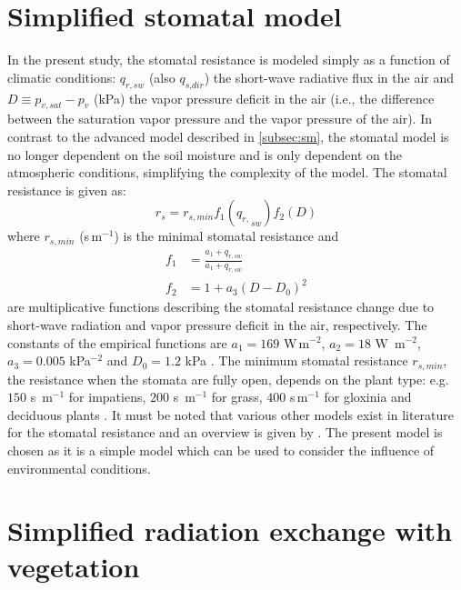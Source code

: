 \section{Simplified stomatal model}
\label{sec:simplifiedstomatalmodel}
In the present study, the stomatal resistance is modeled simply as a function of climatic conditions: $q_{\mathit{r,sw}}$ (also $q_{\textit{s,dir}}$) the short-wave radiative flux in the air and $D\equiv p_{\mathit{v,sat}} - p_v$ (kPa) the vapor pressure deficit in the air (i.e., the difference between the saturation vapor pressure and the vapor pressure of the air). In contrast to the advanced model described in \cref{subsec:sm}, the stomatal model is no longer dependent on the soil moisture and is only dependent on the atmospheric conditions, simplifying the complexity of the model. The stomatal resistance is given as:
\begin{equation}
{r_s} = {r_{s,{\mathit{min}}}}{f_1}({q_{r,}}_{sw}){f_2}(D)
\label{eq:rs}
\end{equation}
where $r_{\mathit{s,min}}$ (s\,m$^{-1}$) is the minimal stomatal resistance and
\begin{align}
f_1 &= \frac{a_1 + q_{\mathit{r,sw}}}{a_1 + q_{\mathit{r,sw}}}\\
f_2 &= 1 + a_3 (D-D_0)^2
\end{align}
are multiplicative functions describing the stomatal resistance change due to short-wave radiation and vapor pressure deficit in the air, respectively. The constants of the empirical functions are $a_1=169$ W\,m$^{-2}$, $a_2=18$ W~m$^{-2}$, $a_3=\num{0.005}$ kPa$^{-2}$ and $D_0=1.2$ kPa \citep{Kichah2012}. The minimum stomatal resistance $r_{s,\mathit{min}}$, the resistance when the stomata are fully open, depends on the plant type: e.g. $150$ s~m$^{-1}$ for impatiens, $200$ s~m$^{-1}$ for grass, $400$ s\,m$^{-1}$ for gloxinia and deciduous plants \citep{Baille1994, Bruse1998}. It must be noted that various other models exist in literature for the stomatal resistance and an overview is given by \cite{Damour2010}. The present model is chosen as it is a simple model which can be used to consider the influence of environmental conditions. 

\section{Simplified radiation exchange with vegetation}
\label{sec:vegradiation}

